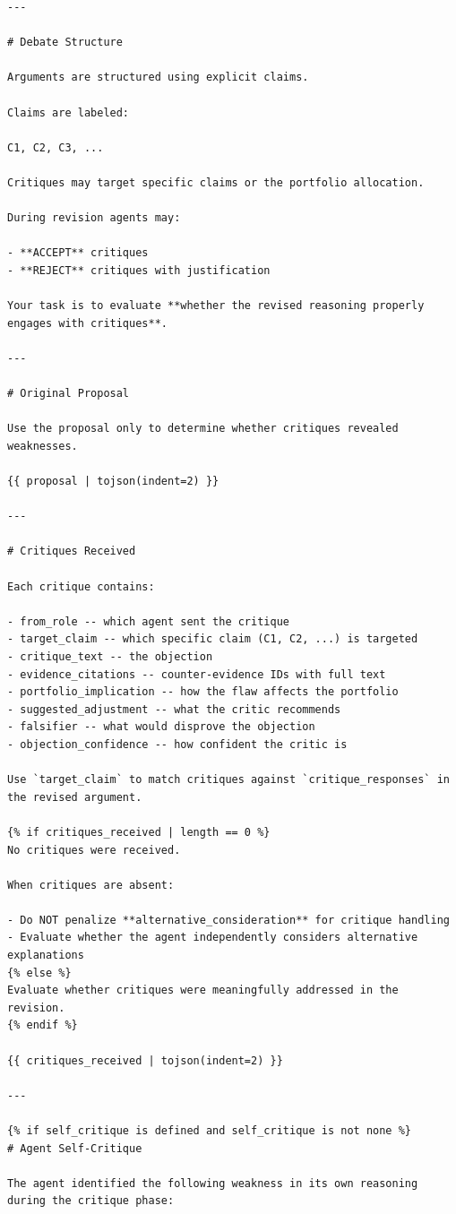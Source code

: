 \documentclass{article}
\begin{document}
\begin{lstlisting}[backgroundcolor=\color{promptbg}]
---

# Debate Structure

Arguments are structured using explicit claims.

Claims are labeled:

C1, C2, C3, ...

Critiques may target specific claims or the portfolio allocation.

During revision agents may:

- **ACCEPT** critiques
- **REJECT** critiques with justification

Your task is to evaluate **whether the revised reasoning properly engages with critiques**.

---

# Original Proposal

Use the proposal only to determine whether critiques revealed weaknesses.

{{ proposal | tojson(indent=2) }}

---

# Critiques Received

Each critique contains:

- from_role -- which agent sent the critique
- target_claim -- which specific claim (C1, C2, ...) is targeted
- critique_text -- the objection
- evidence_citations -- counter-evidence IDs with full text
- portfolio_implication -- how the flaw affects the portfolio
- suggested_adjustment -- what the critic recommends
- falsifier -- what would disprove the objection
- objection_confidence -- how confident the critic is

Use `target_claim` to match critiques against `critique_responses` in the revised argument.

{% if critiques_received | length == 0 %}
No critiques were received.

When critiques are absent:

- Do NOT penalize **alternative_consideration** for critique handling
- Evaluate whether the agent independently considers alternative explanations
{% else %}
Evaluate whether critiques were meaningfully addressed in the revision.
{% endif %}

{{ critiques_received | tojson(indent=2) }}

---

{% if self_critique is defined and self_critique is not none %}
# Agent Self-Critique

The agent identified the following weakness in its own reasoning during the critique phase:


\end{lstlisting}
\end{document}
